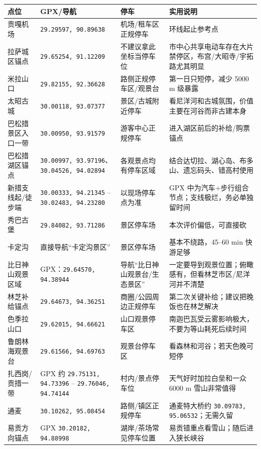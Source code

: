 \documentclass[10.5pt,a4paper]{ctexart}
\newcommand{\coord}[2]{\texttt{#1, #2}}
\begin{document}
\begin{longtable}{p{3.4cm}p{3.6cm}p{4.0cm}p{5.1cm}}
\toprule
点位 & GPX/导航 & 停车 & 实用说明 \\
\midrule
贡嘎机场 & \coord{29.29597}{90.89638} & 机场/租车区正规停车 & 环线起止参考点 \\
拉萨城区锚点 & \coord{29.65254}{91.12209} & 不建议拿此坐标当停车位 & 市中心共享电动车存在大片禁停区，布宫/大昭寺/宇拓路尤其明显 \\
米拉山口 & \coord{29.82155}{92.36628} & 路侧正规停车区/观景台 & 第一日只短停，减少 5000 m 级暴露 \\
太昭古城 & \coord{30.00118}{93.07377} & 景区/古城附近停车 & 看尼洋河和古城氛围，价值主要在河谷而非古建本身 \\
巴松措景区入口一带 & \coord{30.00950}{93.91579} & 游客中心正规停车 & 进入湖区前后的补给/购票锚点 \\
巴松措湖区锚点 & \coord{30.00997}{93.97196}、\coord{30.04526}{94.02894} & 各观景点均有停车区域 & 结合达切拉、湖心岛、布多山、遗忘码头、错高村使用 \\
新措支线起/徒步端 & \coord{30.00333}{94.21345} -- \coord{30.02483}{94.23280} & 以现场停车点为准 & GPX 中为汽车+步行组合节点；支线极烂，务必单独留时间 \\
秀巴古堡 & \coord{29.84082}{93.71286} & 景区停车场 & 本次评价偏低，可直接砍 \\
卡定沟 & 直接导航“卡定沟景区” & 景区停车场 & 基本不绕路，45--60 min 快游足够 \\
比日神山观景区域 & GPX：\coord{29.64570}{94.38944} & 导航“比日神山观景台/生态景区” & 一定要导到观景位置；俯瞰感有，但看林芝市区/尼洋河并不清楚 \\
林芝补给锚点 & \coord{29.64673}{94.36251} & 商圈/公园周边正规停车 & 第二次关键补给；建议把晚饭也在林芝解决 \\
色季拉山口 & \coord{29.62015}{94.66621} & 山口观景停车区 & 南迦巴瓦受云雾影响极大，不要为等山耗死后续时间 \\
鲁朗林海观景台 & \coord{29.61566}{94.69763} & 观景台停车区 & 看森林和河谷；若天色晚可短停 \\
扎西岗/贡措一带 & GPX 约 \coord{29.75131}{94.73396} -- \coord{29.76046}{94.74144} & 村内/景点停车位 & 天气好时加拉白垒和一众 6000 m 雪山非常值得 \\
通麦 & \coord{30.10262}{95.08454} & 路侧/镇区正规停车 & 通麦特大桥约 \coord{30.09783}{95.06532}；无需久留 \\
易贡方向锚点 & GPX \coord{30.20182}{94.88998} & 湖岸/茶场常见停车位置 & 易贡错重点看雪山；随后进入狭长峡谷 \\

\end{longtable}
\end{document}
